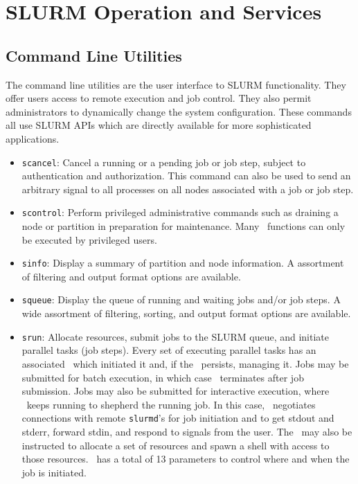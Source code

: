 \section{SLURM Operation and Services}
\subsection{Command Line Utilities}

The command line utilities are the user interface to SLURM functionality.
They offer users access to remote execution and job control. They also 
permit administrators to dynamically change the system configuration. 
These commands all use SLURM APIs which are directly available for 
more sophisticated applications.

\begin{itemize}
\item {\tt scancel}: Cancel a running or a pending job or job step, 
subject to authentication and authorization. This command can also 
be used to send an arbitrary signal to all processes on all nodes 
associated with a job or job step.

\item {\tt scontrol}: Perform privileged administrative commands
such as draining a node or partition in preparation for maintenance. 
Many \scontrol\ functions can only be executed by privileged users.

\item {\tt sinfo}: Display a summary of partition and node information.
A assortment of filtering and output format options are available.

\item {\tt squeue}: Display the queue of running and waiting jobs 
and/or job steps. A wide assortment of filtering, sorting, and output 
format options are available.

\item {\tt srun}: Allocate resources, submit jobs to the SLURM queue,
and initiate parallel tasks (job steps). 
Every set of executing parallel tasks has an associated \srun\ which 
initiated it and, if the \srun\ persists, managing it. 
Jobs may be submitted for batch execution, in which case 
\srun\ terminates after job submission. 
Jobs may also be submitted for interactive execution, where \srun\ keeps 
running to shepherd the running job. In this case, 
\srun\ negotiates connections with remote {\tt slurmd}'s 
for job initiation and to
get stdout and stderr, forward stdin, and respond to signals from the user.
The \srun\ may also be instructed to allocate a set of resources and
spawn a shell with access to those resources.
\srun\ has a total of 13 parameters to control where and when the job 
is initiated.

\end{itemize}

